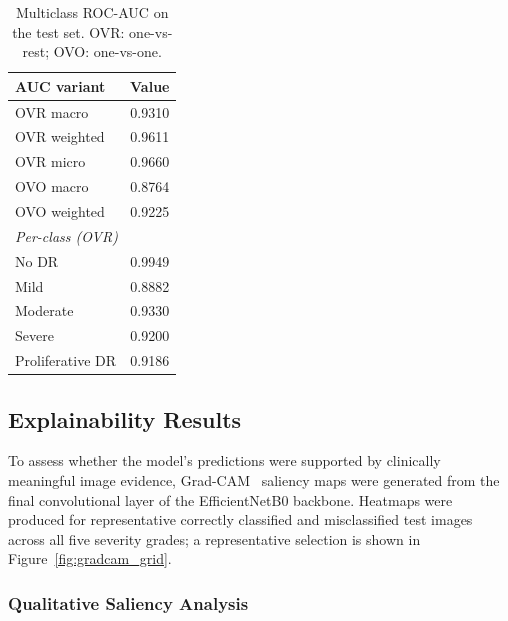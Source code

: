 \begin{table}[H]
\centering
\caption{Multiclass ROC-AUC on the test set. OVR: one-vs-rest; OVO: one-vs-one.}
\label{tab:auc}
\begin{tabular}{lc}
\toprule
AUC variant & Value \\
\midrule
OVR macro      & 0.9310 \\
OVR weighted   & 0.9611 \\
OVR micro      & 0.9660 \\
OVO macro      & 0.8764 \\
OVO weighted   & 0.9225 \\
\midrule
\multicolumn{2}{l}{\emph{Per-class (OVR)}} \\
\quad No DR            & 0.9949 \\
\quad Mild             & 0.8882 \\
\quad Moderate         & 0.9330 \\
\quad Severe           & 0.9200 \\
\quad Proliferative DR & 0.9186 \\
\bottomrule
\end{tabular}
\end{table}


\subsection{Explainability Results}
\label{subsec:xai_results}

To assess whether the model's predictions were supported by clinically meaningful
image evidence, Grad-CAM~\cite{selvaraju2017gradcam} saliency maps were generated
from the final convolutional layer of the EfficientNetB0 backbone. Heatmaps were
produced for representative correctly classified and misclassified test images
across all five severity grades; a representative selection is shown in
Figure~\ref{fig:gradcam_grid}.

\subsubsection{Qualitative Saliency Analysis}
\label{subsubsec:xai_qualitative}

